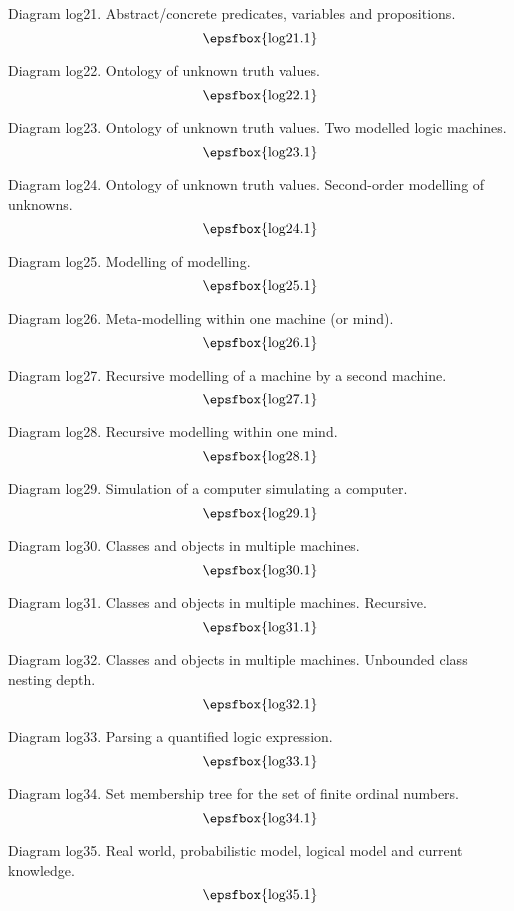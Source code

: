 \filleject

Diagram log21. Abstract/concrete predicates, variables and propositions.
$$
\centerline{\epsfbox{log21.1}}
$$

Diagram log22. Ontology of unknown truth values.
$$
\centerline{\epsfbox{log22.1}}
$$

Diagram log23. Ontology of unknown truth values. Two modelled logic machines.
$$
\centerline{\epsfbox{log23.1}}
$$

\filleject

Diagram log24. Ontology of unknown truth values. Second-order modelling of
unknowns.
$$
\centerline{\epsfbox{log24.1}}
$$

Diagram log25. Modelling of modelling.
$$
\centerline{\epsfbox{log25.1}}
$$

Diagram log26. Meta-modelling within one machine (or mind).
$$
\centerline{\epsfbox{log26.1}}
$$

Diagram log27. Recursive modelling of a machine by a second machine.
$$
\centerline{\epsfbox{log27.1}}
$$

\filleject

Diagram log28. Recursive modelling within one mind.
$$
\centerline{\epsfbox{log28.1}}
$$

Diagram log29. Simulation of a computer simulating a computer.
$$
\centerline{\epsfbox{log29.1}}
$$

Diagram log30. Classes and objects in multiple machines.
$$
\centerline{\epsfbox{log30.1}}
$$

Diagram log31. Classes and objects in multiple machines. Recursive.
$$
\centerline{\epsfbox{log31.1}}
$$

Diagram log32. Classes and objects in multiple machines. Unbounded class nesting
depth.
$$
\centerline{\epsfbox{log32.1}}
$$

\filleject

Diagram log33. Parsing a quantified logic expression.
$$
\centerline{\epsfbox{log33.1}}
$$

Diagram log34. Set membership tree for the set of finite ordinal numbers.
$$
\centerline{\epsfbox{log34.1}}
$$

Diagram log35. Real world, probabilistic model, logical model and current
knowledge.
$$
\centerline{\epsfbox{log35.1}}
$$

